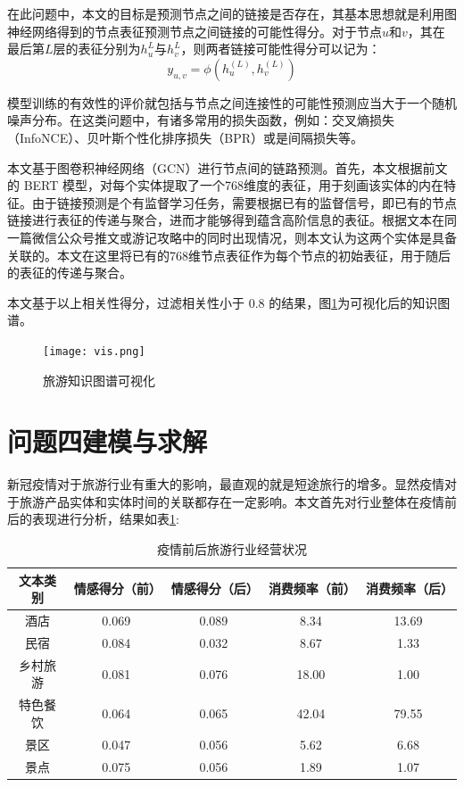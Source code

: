 \documentclass[bwprint]{gmcmthesis}
\begin{document}
在此问题中，本文的目标是预测节点之间的链接是否存在，其基本思想就是利用图神经网络得到的节点表征预测节点之间链接的可能性得分。对于节点$u$和$v$，其在最后第$L$层的表征分别为$h_u^{L}$与$h_v^{L}$，则两者链接可能性得分可以记为：
\begin{equation}
	y_{u, v} = \phi(h_u^{(L)}, h_v^{(L)})
\end{equation}

模型训练的有效性的评价就包括与节点之间连接性的可能性预测应当大于一个随机噪声分布。在这类问题中，有诸多常用的损失函数，例如：交叉熵损失（InfoNCE）、贝叶斯个性化排序损失（BPR）或是间隔损失等。

本文基于图卷积神经网络（GCN）进行节点间的链路预测。首先，本文根据前文的 BERT 模型，对每个实体提取了一个768维度的表征，用于刻画该实体的内在特征。由于链接预测是个有监督学习任务，需要根据已有的监督信号，即已有的节点链接进行表征的传递与聚合，进而才能够得到蕴含高阶信息的表征。根据文本在同一篇微信公众号推文或游记攻略中的同时出现情况，则本文认为这两个实体是具备关联的。本文在这里将已有的768维节点表征作为每个节点的初始表征，用于随后的表征的传递与聚合。

本文基于以上相关性得分，过滤相关性小于 0.8 的结果，图\ref{vis}为可视化后的知识图谱。

\begin{figure}[!h]
  \centering
  \texttt{[image: vis.png]}
  \caption{旅游知识图谱可视化}
  \label{vis}
  \end{figure}


\section{问题四建模与求解}

新冠疫情对于旅游行业有重大的影响，最直观的就是短途旅行的增多。显然疫情对于旅游产品实体和实体时间的关联都存在一定影响。本文首先对行业整体在疫情前后的表现进行分析，结果如表\ref{hangye_beforeafter}:

\begin{center}
    \begin{longtable}{c|c|c|c|c}
      \caption{疫情前后旅游行业经营状况}
      \label{hangye_beforeafter}\\
        \hline
        \textbf{文本类别} & \textbf{情感得分（前）} & \textbf{情感得分（后）} & \textbf{消费频率（前）} & \textbf{消费频率（后）} \\
        \hline
          酒店 & 0.069 & 0.089 &  8.34 & 13.69 \\
		  民宿 & 0.084 & 0.032 &  8.67 & 1.33 \\
		  乡村旅游 & 0.081 & 0.076 & 18.00 & 1.00 \\
		  特色餐饮 & 0.064 & 0.065 & 42.04 & 79.55 \\
		  景区 & 0.047 & 0.056 & 5.62 & 6.68 \\
		  景点 & 0.075 & 0.056 & 1.89 & 1.07 \\
        \hline
    \end{longtable}
    \end{center}
\end{document}
